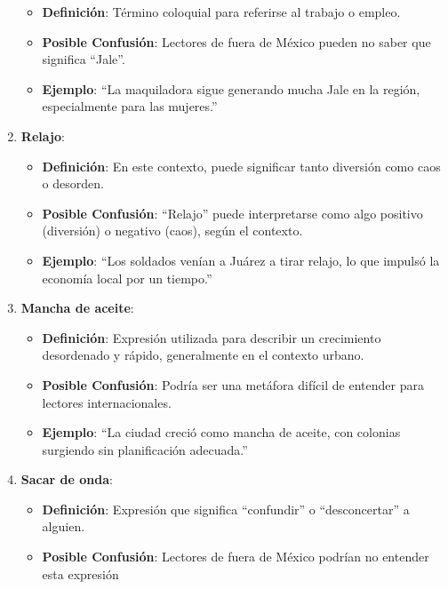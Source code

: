 \documentclass[
  10pt,
  letterpaper,
]{book}
\providecommand{\tightlist}{%
  \setlength{\itemsep}{0pt}\setlength{\parskip}{0pt}}\usepackage{longtable,booktabs,array}
\begin{document}
\begin{enumerate}
  \begin{itemize}
  \tightlist
  \item
    \textbf{Definición}: Término coloquial para referirse al trabajo o
    empleo.
  \item
    \textbf{Posible Confusión}: Lectores de fuera de México pueden no
    saber que significa ``Jale''.
  \item
    \textbf{Ejemplo}: ``La maquiladora sigue generando mucha Jale en la
    región, especialmente para las mujeres.''
  \end{itemize}
\item
  \textbf{Relajo}:

  \begin{itemize}
  \tightlist
  \item
    \textbf{Definición}: En este contexto, puede significar tanto
    diversión como caos o desorden.
  \item
    \textbf{Posible Confusión}: ``Relajo'' puede interpretarse como algo
    positivo (diversión) o negativo (caos), según el contexto.
  \item
    \textbf{Ejemplo}: ``Los soldados venían a Juárez a tirar relajo, lo
    que impulsó la economía local por un tiempo.''
  \end{itemize}
\item
  \textbf{Mancha de aceite}:

  \begin{itemize}
  \tightlist
  \item
    \textbf{Definición}: Expresión utilizada para describir un
    crecimiento desordenado y rápido, generalmente en el contexto
    urbano.
  \item
    \textbf{Posible Confusión}: Podría ser una metáfora difícil de
    entender para lectores internacionales.
  \item
    \textbf{Ejemplo}: ``La ciudad creció como mancha de aceite, con
    colonias surgiendo sin planificación adecuada.''
  \end{itemize}
\item
  \textbf{Sacar de onda}:

  \begin{itemize}
  \tightlist
  \item
    \textbf{Definición}: Expresión que significa ``confundir'' o
    ``desconcertar'' a alguien.
  \item
    \textbf{Posible Confusión}: Lectores de fuera de México podrían no
    entender esta expresión
  \end{itemize}
\end{enumerate}
\end{document}
